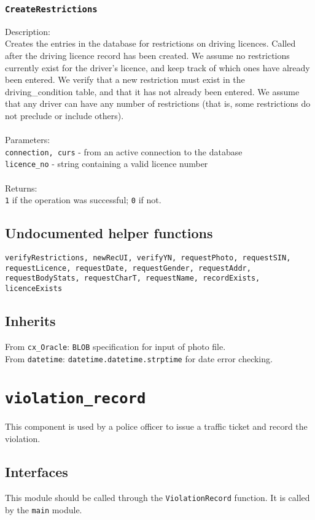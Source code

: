 \documentclass[12pt]{article}
\begin{document}
\subsubsection{\texttt{CreateRestrictions}}
Description:\\
\indent Creates the entries in the database for restrictions on driving licences. Called after the driving licence record has been created. We assume no restrictions currently exist for the driver's licence, and keep track of which ones have already been entered. We verify that a new restriction must exist in the driving\_condition table, and that it has not already been entered. We assume that any driver can have any number of restrictions (that is, some restrictions do not preclude or include others).\\\\
Parameters:\\
\indent\texttt{connection, curs} - from an active connection to the database\\
\indent\texttt{licence\_no} - string containing a valid licence number\\\\
Returns:\\
\indent \texttt{1} if the operation was successful; \texttt{0} if not.

\subsection{Undocumented helper functions}
\texttt{verifyRestrictions, newRecUI, verifyYN, requestPhoto, requestSIN, requestLicence, requestDate, requestGender, requestAddr, requestBodyStats, requestCharT, requestName, recordExists, licenceExists}

\subsection{Inherits}
From \texttt{cx\_Oracle}: \texttt{BLOB} specification for input of photo file.\\
From \texttt{datetime}: \texttt{datetime.datetime.strptime} for date error checking.

\newpage
\section{\texttt{violation\_record}}
 This component is used by a police officer to issue a traffic ticket
    and record the violation.
\subsection{Interfaces}
This module should be called through the \texttt{ViolationRecord} function. It is called by the \texttt{main} module.
\end{document}
